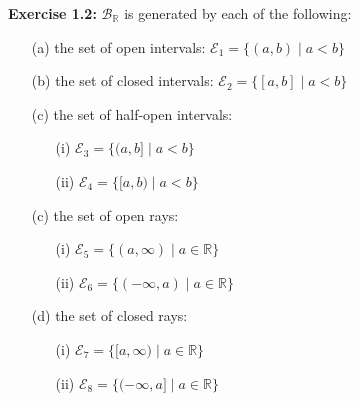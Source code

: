 \documentclass{book}
\newcommand{\exOne}{%
   \color{Purple}%
   \fontsize{13}{15}\selectfont%
}
\newcommand{\blab}[1]{\textbf{#1}}
\newcommand{\retTwo}{\hfill\bigbreak}
\begin{document}
\exOne\blab{Exercise 1.2:} $\mathcal{B}_\mathbb{R}$ is generated by each of the following:
\begin{itemize}
   \item [(a)] the set of open intervals: $\mathcal{E}_1 = \{(a, b) \mid a < b\}$
   \item [(b)] the set of closed intervals: $\mathcal{E}_2 = \{[a, b] \mid a < b\}$
   \item [(c)] the set of half-open intervals:
   \begin{itemize}
      \item[(i)] $\mathcal{E}_3 = \{(a, b] \mid a < b\}$
      \item[(ii)] $\mathcal{E}_4 = \{[a, b) \mid a < b\}$
   \end{itemize}
   \item [(c)] the set of open rays:
   \begin{itemize}
      \item[(i)] $\mathcal{E}_5 = \{(a, \infty) \mid a \in \mathbb{R}\}$
      \item[(ii)] $\mathcal{E}_6 = \{(-\infty, a) \mid a \in \mathbb{R}\}$
   \end{itemize}
   \item [(d)] the set of closed rays:
   \begin{itemize}
      \item[(i)] $\mathcal{E}_7 = \{[a, \infty) \mid a \in \mathbb{R}\}$
      \item[(ii)] $\mathcal{E}_8 = \{(-\infty, a] \mid a \in \mathbb{R}\}$\retTwo
   \end{itemize}
\end{itemize}
\end{document}
